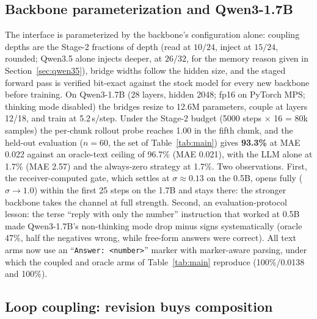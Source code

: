 \documentclass[11pt]{article}
\newcommand{\code}[1]{\texttt{#1}}
\begin{document}
\subsection{Backbone parameterization and Qwen3-1.7B}
\label{sec:scaling17}

The interface is parameterized by the backbone's configuration alone: coupling depths are the Stage-2 fractions of depth (read at $10/24$, inject at $15/24$, rounded; Qwen3.5 alone injects deeper, at $26/32$, for the memory reason given in Section~\ref{sec:qwen35}), bridge widths follow the hidden size, and the staged forward pass is verified bit-exact against the stock model for every new backbone before training. On Qwen3-1.7B \citep{qwen2025qwen3} (28 layers, hidden 2048; fp16 on PyTorch MPS; thinking mode disabled) the bridges resize to 12.6M parameters, couple at layers 12/18, and train at 5.2\,s/step. Under the Stage-2 budget (5000 steps $\times$ 16 = 80k samples) the per-chunk rollout probe reaches 1.00 in the fifth chunk, and the held-out evaluation ($n{=}60$, the set of Table~\ref{tab:main}) gives \textbf{93.3\%} at MAE 0.022 against an oracle-text ceiling of 96.7\% (MAE 0.021), with the LLM alone at 1.7\% (MAE 2.57) and the always-zero strategy at 1.7\%. Two observations. First, the receiver-computed gate, which settles at $\sigma\approx0.13$ on the 0.5B, opens fully ($\sigma\to1.0$) within the first 25 steps on the 1.7B and stays there: the stronger backbone takes the channel at full strength. Second, an evaluation-protocol lesson: the terse ``reply with only the number'' instruction that worked at 0.5B made Qwen3-1.7B's non-thinking mode drop minus signs systematically (oracle 47\%, half the negatives wrong, while free-form answers were correct). All text arms now use an ``\code{Answer:\ <number>}'' marker with marker-aware parsing, under which the coupled and oracle arms of Table~\ref{tab:main} reproduce (100\%/0.0138 and 100\%).

\subsection{Loop coupling: revision buys composition}
\label{sec:loop}
\end{document}
